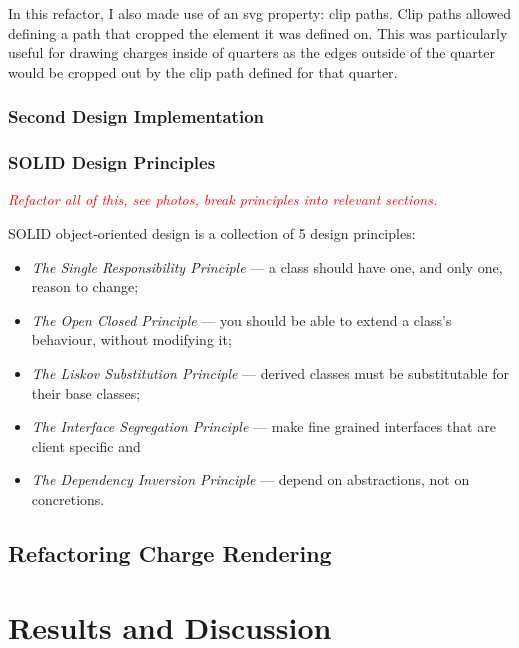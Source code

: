 \documentclass[nobib, a4paper, twoside, justified]{tufte-book}
\makeatletter
\newcommand{\svg}{\gls{svg}\@\xspace}
\newcommand{\charges}{\glspl{charge}\@\xspace}
\newcommand{\quarter}{\gls{quarter}\@\xspace}
\newcommand{\quarters}{\glspl{quarter}\@\xspace}
\newcommand{\todo}[1]{{\noindent\textcolor{Red}{\textit{\quad#1}}\par}}
\makeatother
\begin{document}
In this refactor, I also made use of an \svg property: clip paths. Clip paths allowed defining a
path that cropped the element it was defined on. This was particularly useful for drawing \charges
inside of \quarters as the edges outside of the \quarter would be cropped out by the clip path
defined for that \quarter.

\subsection{Second Design Implementation}%
\label{sub:second_design_implementation}



\subsection{SOLID Design Principles}%
\label{sub:solid_design_principles}

\todo{Refactor all of this, see photos, break principles into relevant sections.}

SOLID object-oriented design is a collection of 5 design principles:

\begin{itemize}
  \item \textit{The Single Responsibility Principle} --- a class should have one, and only one,
    reason to change;
  \item \textit{The Open Closed Principle} --- you should be able to extend a class's behaviour,
    without modifying it;
  \item \textit{The Liskov Substitution Principle} --- derived classes must be substitutable for
    their base classes;
  \item \textit{The Interface Segregation Principle} --- make fine grained interfaces that are
    client specific and
  \item \textit{The Dependency Inversion Principle} --- depend on abstractions, not on concretions.
\end{itemize}

\section{Refactoring Charge Rendering}%
\label{sec:refactoring_charge_rendering}

\chapter{Results and Discussion}%
\label{cha:results_and_discussion}
\end{document}
